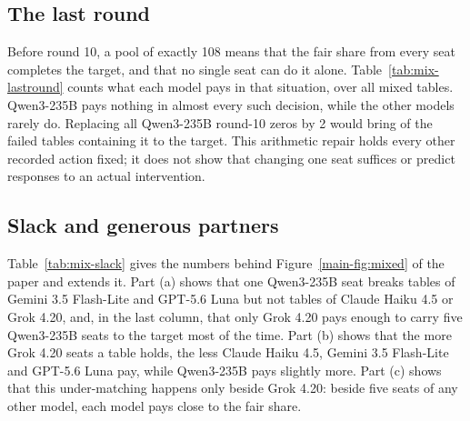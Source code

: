 \documentclass[10pt]{article}
\let\plainsubsection\subsection
\renewcommand{\subsection}{\FloatBarrier\needspace{8\baselineskip}\plainsubsection}
\begin{document}
\subsection{The last round}

Before round 10, a pool of exactly 108 means that the fair share from every seat completes the target, and that no single seat can do it alone. Table~\ref{tab:mix-lastround} counts what each model pays in that situation, over all mixed tables. Qwen3-235B pays nothing in almost every such decision, while the other models rarely do. Replacing all Qwen3-235B round-10 zeros by 2 would bring \SupMixQwenPivotalFixed{} of the \MixMissWithQwen{} failed tables containing it to the target. This arithmetic repair holds every other recorded action fixed; it does not show that changing one seat suffices or predict responses to an actual intervention.

\begin{table}[h]
\caption{Top: round-10 decisions at mixed tables whose pool after round 9 is exactly 108, by model: share paying 0, number of decisions and number of games. Bottom: missed mixed tables, those with a Qwen3-235B seat, and those among them that reach 120 when Qwen3-235B's round-10 zeros are replaced by 2.}
\label{tab:mix-lastround}
\centering\small

\end{table}

\subsection{Slack and generous partners}

Table~\ref{tab:mix-slack} gives the numbers behind Figure~\ref{main-fig:mixed} of the paper and extends it. Part (a) shows that one Qwen3-235B seat breaks tables of Gemini 3.5 Flash-Lite and GPT-5.6 Luna but not tables of Claude Haiku 4.5 or Grok 4.20, and, in the last column, that only Grok 4.20 pays enough to carry five Qwen3-235B seats to the target most of the time. Part (b) shows that the more Grok 4.20 seats a table holds, the less Claude Haiku 4.5, Gemini 3.5 Flash-Lite and GPT-5.6 Luna pay, while Qwen3-235B pays slightly more. Part (c) shows that this under-matching happens only beside Grok 4.20: beside five seats of any other model, each model pays close to the fair share.

\begin{table}[h]
\caption{Slack at mixed tables, pooled over risk levels, with 95\% intervals. (a) Games reaching the target: six seats of the model (60 games), five seats and one Qwen3-235B seat (30 games), and one seat beside five Qwen3-235B seats (30 games). (b) Units paid per seat of the model beside one to five Grok 4.20 seats (30 games each), and beside five seats of another model (90 games). (c) Units paid by a single seat beside five seats of each other model (30 games each).}
\label{tab:mix-slack}
\centering\small

\end{table}
\end{document}
